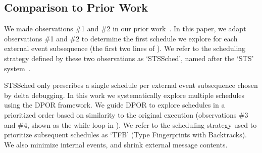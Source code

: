 \subsection{Comparison to Prior Work}

We made observations \#1 and \#2 in our prior work~\cite{sts2014}. In this
paper, we adapt observations \#1 and \#2 to determine the first schedule we
explore for each external event subsequence (the first two lines of ). We refer
to the scheduling strategy defined by these two observations as `STSSched', named
after the `STS' system~\cite{sts2014}.

STSSched only prescribes a single schedule per external event subsequence
chosen by delta debugging. In
this work we systematically explore multiple schedules using the DPOR
framework. We guide DPOR to explore schedules in a prioritized order based on similarity to the original execution
(observations \#3 and \#4, shown as the while loop in ).
We refer to the scheduling strategy used to prioritize subsequent schedules as `TFB' (Type Fingerprints with Backtracks).
We also minimize internal events, and shrink external message contents.


%
%


